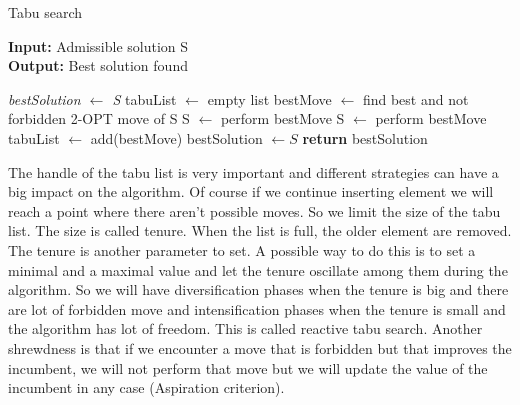 \begin{algorithm}
	\caption{Tabu search}\label{TabuSearch method}
	\hspace*{\algorithmicindent} \textbf{Input:} Admissible solution S \\
	\hspace*{\algorithmicindent} \textbf{Output:} Best solution found
    \begin{algorithmic}[1]
    		\State \textit{bestSolution $\leftarrow$ S}
				\State tabuList $\leftarrow$ empty list
			\EndIf
			\State bestMove $\leftarrow$ find best and not forbidden 2-OPT move of S
				\State S $\leftarrow$ perform bestMove
			\Else
				\State S $\leftarrow$ perform bestMove
				\State tabuList $\leftarrow$ add(bestMove)
			\EndIf
				\State bestSolution $\leftarrow S$
			\EndIf
		\EndWhile
		\State \textbf{return} bestSolution
    \end{algorithmic}
\end{algorithm}

\noindent The handle of the tabu list is very important and different strategies can have a big impact on the algorithm. Of course if we continue inserting element we will reach a point where there aren't possible moves. So we limit the size of the tabu list. The size is called tenure. When the list is full, the older element are removed.
The tenure is another parameter to set. A possible way to do this is to set a minimal and a maximal value and let the tenure oscillate among them during the algorithm. So we will have diversification phases when the tenure is big and there are lot of forbidden move and intensification phases when the tenure is small and the algorithm has lot of freedom. This is called reactive tabu search.
Another shrewdness is that if we encounter a move that is forbidden but that improves the incumbent, we will not perform that move but we will update the value of the incumbent in any case (Aspiration criterion).\\

